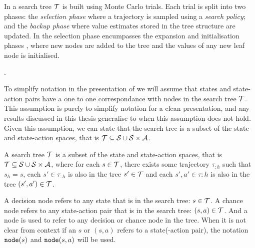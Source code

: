 
        In \thtspp\ewe a search tree $\mathcal{T}$ is built using Monte Carlo trials. Each trial is split into two phases: the \textit{selection phase} where a trajectory is sampled using a \textit{search policy}; and the \textit{backup phase} where value estimates stored in the tree structure are updated. In \thtspp\ewe the selection phase encumpasses the expansion and initialisation phases , where new nodes are added to the tree and the values of any new leaf node is initialised. 

        .

        To simplify notation in the presentation of \thtspp\ewe we will assume that states and state-action pairs have a one to one correspondance with nodes in the search tree $\mathcal{T}$. This assumption is purely to simplify notation for a clean presentation, and any results discussed in this thesis generalise to when this assumption does not hold. Given this assumption, we can state that the search tree is a subset of the state and state-action spaces, that is $\mathcal{T}\subseteq \mathcal{S} \cup \mathcal{S} \times \mathcal{A}$. 

        \begin{defn}
            A \textnormal{search tree} $\mathcal{T}$ is a subset of the state and state-action spaces, that is $\mathcal{T}\subseteq \mathcal{S} \cup \mathcal{S} \times \mathcal{A}$, where for each $s\in\mathcal{T}$, there exists some trajectory $\tau_{:h}$ such that $s_h = s$, each $s'\in\tau_{:h}$ is also in the tree $s'\in\mathcal{T}$ and each $s',a'\in\tau{:h}$ is also in the tree $(s',a')\in\mathcal{T}$.
        \end{defn}




        \begin{defn}
            A \textnormal{decision node} refers to any state that is in the search tree: $s\in\mathcal{T}$. A \textnormal{chance node} refers to any state-action pair that is in the search tree: $(s,a)\in\mathcal{T}$. And a \textnormal{node} is used to refer to any decision or chance node in the tree. When it is not clear from context if an $s$ or $(s,a)$ refers to a state(-action pair), the notation ${\textnormal{\texttt{node}}}(s)$ and ${\textnormal{\texttt{node}}}(s,a)$ will be used. 
        \end{defn}

